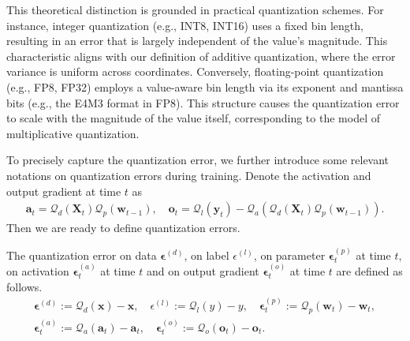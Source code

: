 \documentclass[11pt, letterpaper]{article}
\begin{document}
This theoretical distinction is grounded in practical quantization schemes. For instance, integer quantization (e.g., INT8, INT16) uses a fixed bin length, resulting in an error that is largely independent of the value's magnitude. This characteristic aligns with our definition of additive quantization, where the error variance is uniform across coordinates. Conversely, floating-point quantization (e.g., FP8, FP32) employs a value-aware bin length via its exponent and mantissa bits (e.g., the E4M3 format in FP8). This structure causes the quantization error to scale with the magnitude of the value itself, corresponding to the model of multiplicative quantization. 

To precisely capture the quantization error, we further introduce some relevant notations on quantization errors during training. Denote the activation and output gradient at time $t$ as 
\begin{equation*}
    \begin{aligned}
        \mathbf{a}_t=\mathcal{Q}_d(\mathbf{X}_t)\mathcal{Q}_p(\mathbf{w}_{t-1}),\quad \mathbf{o}_t=\mathcal{Q}_l(\mathbf{y}_t)-\mathcal{Q}_a\left(\mathcal{Q}_d(\mathbf{X}_t)\mathcal{Q}_p(\mathbf{w}_{t-1})\right).
    \end{aligned}
\end{equation*}
Then we are ready to define quantization errors.
\begin{definition}
    The quantization error on data $\boldsymbol{\epsilon}^{(d)}$, on label $\epsilon^{(l)}$, on parameter $\boldsymbol{\epsilon}_t^{(p)}$ at time $t$, on activation $\boldsymbol{\epsilon}_t^{(a)}$ at time $t$ and on output gradient $\boldsymbol{\epsilon}_t^{(o)}$ at time $t$ are defined as follows.
    \begin{gather*}
        \boldsymbol{\epsilon}^{(d)}:=\mathcal{Q}_d(\mathbf{x})-\mathbf{x},\quad \epsilon^{(l)}:=\mathcal{Q}_l(y)-y,\quad \boldsymbol{\epsilon}_t^{(p)}:=\mathcal{Q}_p(\mathbf{w}_t)-\mathbf{w}_t,\\ \boldsymbol{\epsilon}_t^{(a)}:=\mathcal{Q}_a(\mathbf{a}_t)-\mathbf{a}_t,\quad \boldsymbol{\epsilon}_t^{(o)}:=\mathcal{Q}_o(\mathbf{o}_t)-\mathbf{o}_t.
    \end{gather*}
\end{definition}
\end{document}

